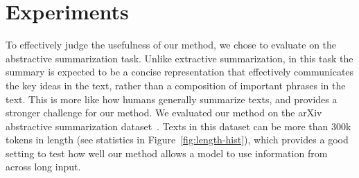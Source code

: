 \documentclass{article}
\begin{document}

\section{Experiments}\label{section:experiments}

To effectively judge the usefulness of our method, we chose to evaluate on the abstractive summarization task. Unlike extractive summarization, in this task the summary is expected to be a concise representation that effectively communicates the key ideas in the text, rather than a composition of important phrases in the text. This is more like how humans generally summarize texts, and provides a stronger challenge for our method. We evaluated our method on the arXiv abstractive summarization dataset~\cite{cohan-etal-2018-discourse}. Texts in this dataset can be more than 300k tokens in length (see statistics in Figure~\ref{fig:length-hist}), which provides a good setting to test how well our method allows a model to use information from across long input.
\end{document}
